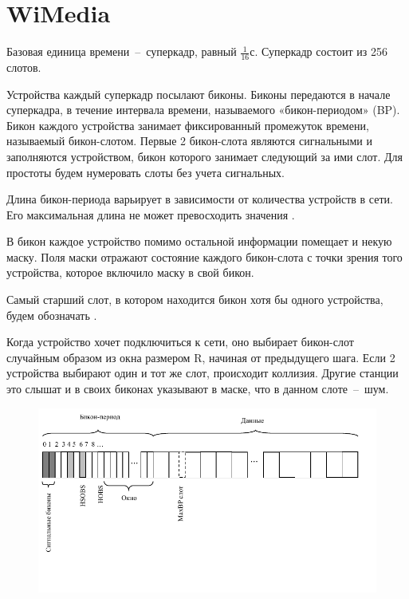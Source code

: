 \newcommand{\MaxBP}{\text{MaxBP}}
\newcommand{\HOBS}{\text{HOBS}}
\newcommand{\HSOBS}{\text{HSOBS}}

\section{WiMedia}

Базовая единица времени~--~суперкадр, равный $\frac{1}{16}$с. Суперкадр состоит из 256 слотов.

Устройства каждый суперкадр посылают биконы. Биконы передаются в начале суперкадра, в течение интервала времени, называемого «бикон-периодом» (BP). Бикон каждого устройства занимает фиксированный промежуток времени, называемый бикон-слотом. Первые 2 бикон-слота являются сигнальными и заполняются устройством, бикон которого занимает следующий за ими слот. Для простоты будем нумеровать слоты без учета сигнальных.

Длина бикон-периода варьирует в зависимости от количества устройств в сети. Его максимальная длина не может превосходить значения \MaxBP.

В бикон каждое устройство помимо остальной информации помещает и некую маску. Поля маски отражают состояние каждого бикон-слота с точки зрения того устройства, которое включило маску в свой бикон.

Самый старший слот, в котором находится бикон хотя бы одного устройства, будем обозначать \HOBS.

Когда устройство хочет подключиться к сети, оно выбирает бикон-слот случайным образом из окна размером R, начиная от \HOBS предыдущего шага. Если 2 устройства выбирают один и тот же слот, происходит коллизия. Другие станции это слышат и в своих биконах указывают в маске, что в данном слоте~--~шум.

\begin{figure}[h]
\includegraphics[width=\textwidth]{Wimedia3.pdf}
\end{figure}

